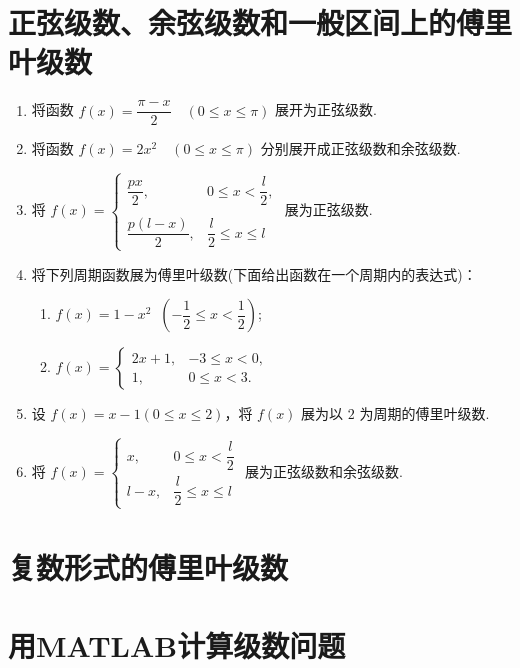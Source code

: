 \section{正弦级数、余弦级数和一般区间上的傅里叶级数}

\begin{enumerate}\setlength{\itemsep}{7pt}
    \item 将函数 $f(x)=\dfrac{\pi-x}{2}\quad(0\leqslant x\leqslant \pi)$ 展开为正弦级数.
    
    \item 将函数 $f(x)=2x^2\quad(0\leqslant x\leqslant \pi)$ 分别展开成正弦级数和余弦级数.
    
    \item 将 $f(x)=\begin{cases}
        \dfrac{px}{2},&0\leqslant x<\dfrac{l}{2},\\\\
        \dfrac{p(l-x)}{2},&\dfrac{l}{2}\leqslant x\leqslant l
    \end{cases}$ 
    展为正弦级数.

    \item 将下列周期函数展为傅里叶级数(下面给出函数在一个周期内的表达式)：
    \begin{enumerate}[(1)]\setlength{\itemsep}{10pt}\setlength{\topsep}{15pt}
        \item $f(x)=1-x^2\;\;\left(-\dfrac{1}{2}\leqslant x<\dfrac{1}{2}\right)$;
        \item $f(x)=\begin{cases}
            2x+1,&-3\leqslant x<0,\\
            1,&0\leqslant x<3.
        \end{cases}$
    \end{enumerate}

    \item 设 $f(x)=x-1(0\leqslant x\leqslant2)$，将 $f(x)$ 展为以 $2$ 为周期的傅里叶级数.
    
    \item 将 $f(x)=\begin{cases}
            x,&0\leqslant x<\dfrac{l}{2}\\
            l-x,&\dfrac{l}{2}\leqslant x\leqslant l
    \end{cases}$ 展为正弦级数和余弦级数.
\end{enumerate}

\section{复数形式的傅里叶级数}

\section{用MATLAB计算级数问题}



